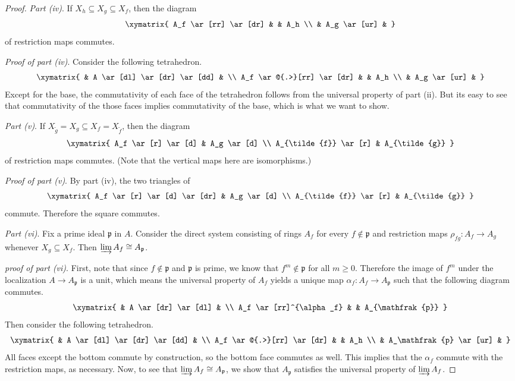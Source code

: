 \begin{proof}
\emph{Part (iv)}.
If $ X_h \subseteq X_g \subseteq X_f$, then the diagram
\[ \xymatrix{
A_f \ar[rr] \ar[dr] & & A_h \\
& A_g \ar[ur] &
} \]
of restriction maps commutes.

\emph{Proof of part (iv)}.
Consider the following tetrahedron.
\[ \xymatrix{
& A \ar[dl] \ar[dr] \ar[dd] & \\
A_f \ar@{.>}[rr] \ar[dr] & & A_h \\
& A_g \ar[ur] &
} \]
Except for the base, the commutativity of each face of the
tetrahedron follows from the universal property of part (ii).
But its easy to see that commutativity of the those faces
implies commutativity of the base, which is what we want to
show.

\emph{Part (v)}.
If $ X_{\tilde{g}} = X_g \subseteq X_f = X_{\tilde{f}}$, then
the diagram
\[ \xymatrix{
A_f \ar[r] \ar[d] & A_g \ar[d] \\
A_{\tilde{f}} \ar[r] & A_{\tilde{g}}
} \]
of restriction maps commutes. (Note that the vertical maps here
are isomorphisms.)

\emph{Proof of part (v)}.
By part (iv), the two triangles of
\[ \xymatrix{
A_f \ar[r] \ar[d] \ar[dr] & A_g \ar[d] \\
A_{\tilde{f}} \ar[r] & A_{\tilde{g}}
} \]
commute. Therefore the square commutes.

\emph{Part (vi)}.
Fix a prime ideal $ \mathfrak{p}$ in $ A$. Consider the direct
system consisting of rings $ A_f$ for every $ f \notin
\mathfrak{p}$ and restriction maps $ \rho_{fg} : A_f \to A_g$
whenever $ X_g \subseteq X_f$. Then $ \varinjlim A_f \cong
A_{\mathfrak{p}}$.

\emph{proof of part (vi)}.
First, note that since $ f \notin \mathfrak{p}$ and $
\mathfrak{p}$ is prime, we know that $ f^m \notin \mathfrak{p}$
for all $ m \geq 0$. Therefore the image of $ f^m$ under the
localization $ A \to A_\mathfrak{p}$ is a unit, which means the
universal property of $ A_f$ yields a unique map $ \alpha_f :
A_f \to A_\mathfrak{p}$ such that the following diagram
commutes.
\[ \xymatrix{
& A \ar[dr] \ar[dl] & \\
A_f \ar[rr]^{\alpha_f} & & A_{\mathfrak{p}}
} \]
Then consider the following tetrahedron.
\[ \xymatrix{
& A \ar[dl] \ar[dr] \ar[dd] & \\
A_f \ar@{.>}[rr] \ar[dr] & & A_h \\
& A_\mathfrak{p} \ar[ur] &
} \]
All faces except the bottom commute by construction, so the
bottom face commutes as well. This implies that the $ \alpha_f$
commute with the restriction maps, as necessary. Now, to see
that $ \varinjlim A_f \cong A_\mathfrak{p}$, we show that $
A_\mathfrak{p}$ satisfies the universal property of $ \varinjlim
A_f$.


\end{proof}
